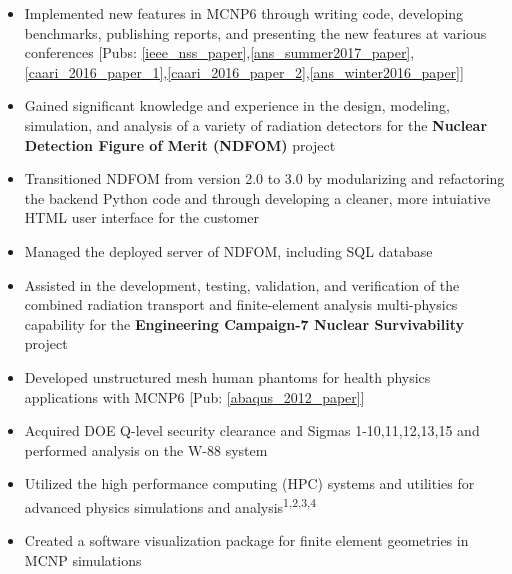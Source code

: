 \begin{minipage}{\textwidth}
    \begin{center}
	\begin{itemize}
	    \item Implemented new features in \textsc{MCNP6} through writing code, developing benchmarks, publishing reports, 
		    and presenting the new features at various conferences [Pubs: \ref{ieee_nss_paper},\ref{ans_summer2017_paper},\ref{caari_2016_paper_1},\ref{caari_2016_paper_2},\ref{ans_winter2016_paper}]\none 
		\item Gained significant knowledge and experience in the design, modeling, simulation, and analysis 
		    of a variety of radiation detectors for the \textbf{Nuclear Detection Figure of Merit (NDFOM)} project\ntwo
	    \item Transitioned NDFOM from version 2.0 to 3.0 by modularizing and refactoring the backend 
		   Python code and through developing a cleaner, more intuiative HTML user interface for the customer\ntwo
	    \item Managed the deployed server of NDFOM, including SQL database\ntwo
	    \item Assisted in the development, testing, validation, and verification of the combined radiation transport and 
		    finite-element analysis multi-physics capability for the \textbf{Engineering Campaign-7 Nuclear Survivability} project\nthree
	    \item Developed unstructured mesh human phantoms for health physics applications with \textsc{MCNP6} [Pub: \ref{abaqus_2012_paper}]\nthree
	    \item Acquired DOE Q-level security clearance and Sigmas 1-10,11,12,13,15 and performed analysis on the W-88 system\nthree
	    \item Utilized the high performance computing (HPC) systems and utilities for advanced physics simulations and analysis\textsuperscript{1,2,3,4}
	    \item Created a software visualization package for finite element geometries in MCNP simulations\nfour

\end{itemize}
\end{center}
\end{minipage}
